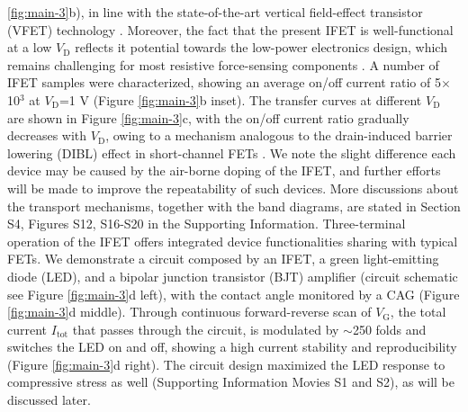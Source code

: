 \ref{fig:main-3}b), in line with the state-of-the-art vertical
field-effect transistor (VFET) technology
\cite{Yang2012Barristor,Shih2015Partially,Sun_2017_COF_VFET,Ben_Sasson_2011}. Moreover,
the fact that the present IFET is well-functional at a low
\(V_{\mathrm{D}}\) reflects it potential towards the low-power
electronics design, which remains challenging for most resistive
force-sensing components \cite{Pan_2014,Pang_2012}. A number of IFET
samples were characterized, showing an average on/off current ratio
of 5\(\times\)10\(^{\text{3}}\) at \(V_{\mathrm{D}}\)=1 V (Figure
\ref{fig:main-3}b inset). The transfer curves at different
\(V_{\mathrm{D}}\) are shown in Figure \ref{fig:main-3}c, with the on/off
current ratio gradually decreases with \(V_{\mathrm{D}}\), owing to a
mechanism analogous to the drain-induced barrier lowering (DIBL)
effect in short-channel FETs \cite{Lundstrom_2003}. We note the slight
difference each device may be caused by the air-borne doping of the
IFET, and further efforts will be made to improve the repeatability
of such devices. More discussions about the transport mechanisms,
together with the band diagrams, are stated in Section S4, Figures
S12, S16-S20 in the Supporting Information. Three-terminal operation
of the IFET offers integrated device functionalities sharing with
typical FETs. We demonstrate a circuit composed by an IFET, a green
light-emitting diode (LED), and a bipolar junction transistor (BJT)
amplifier (circuit schematic see Figure \ref{fig:main-3}d left), with
the contact angle monitored by a CAG (Figure \ref{fig:main-3}d
middle). Through continuous forward-reverse scan of \(V_{\mathrm{G}}\),
the total current \(I_{\mathrm{tot}}\) that passes through the circuit,
is modulated by \(\sim\)250 folds and switches the LED on and off,
showing a high current stability and reproducibility (Figure
\ref{fig:main-3}d right). The circuit design maximized the LED response
to compressive stress as well (Supporting Information Movies S1 and S2), as
will be discussed later.

